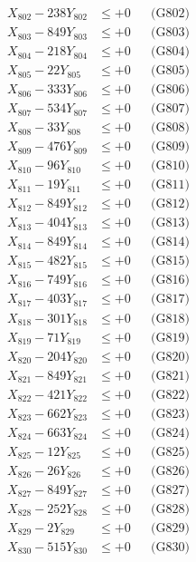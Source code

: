 \documentclass[a4paper,10pt]{article}
\begin{document}
{\begin{align}
X_{802} - 238Y_{802} &\leq +0 && \text{(G802)} \\
X_{803} - 849Y_{803} &\leq +0 && \text{(G803)} \\
X_{804} - 218Y_{804} &\leq +0 && \text{(G804)} \\
X_{805} - 22Y_{805} &\leq +0 && \text{(G805)} \\
X_{806} - 333Y_{806} &\leq +0 && \text{(G806)} \\
X_{807} - 534Y_{807} &\leq +0 && \text{(G807)} \\
X_{808} - 33Y_{808} &\leq +0 && \text{(G808)} \\
X_{809} - 476Y_{809} &\leq +0 && \text{(G809)} \\
X_{810} - 96Y_{810} &\leq +0 && \text{(G810)} \\
\allowbreak
X_{811} - 19Y_{811} &\leq +0 && \text{(G811)} \\
X_{812} - 849Y_{812} &\leq +0 && \text{(G812)} \\
X_{813} - 404Y_{813} &\leq +0 && \text{(G813)} \\
X_{814} - 849Y_{814} &\leq +0 && \text{(G814)} \\
X_{815} - 482Y_{815} &\leq +0 && \text{(G815)} \\
X_{816} - 749Y_{816} &\leq +0 && \text{(G816)} \\
X_{817} - 403Y_{817} &\leq +0 && \text{(G817)} \\
X_{818} - 301Y_{818} &\leq +0 && \text{(G818)} \\
X_{819} - 71Y_{819} &\leq +0 && \text{(G819)} \\
X_{820} - 204Y_{820} &\leq +0 && \text{(G820)} \\
\allowbreak
X_{821} - 849Y_{821} &\leq +0 && \text{(G821)} \\
X_{822} - 421Y_{822} &\leq +0 && \text{(G822)} \\
X_{823} - 662Y_{823} &\leq +0 && \text{(G823)} \\
X_{824} - 663Y_{824} &\leq +0 && \text{(G824)} \\
X_{825} - 12Y_{825} &\leq +0 && \text{(G825)} \\
X_{826} - 26Y_{826} &\leq +0 && \text{(G826)} \\
X_{827} - 849Y_{827} &\leq +0 && \text{(G827)} \\
X_{828} - 252Y_{828} &\leq +0 && \text{(G828)} \\
X_{829} - 2Y_{829} &\leq +0 && \text{(G829)} \\
X_{830} - 515Y_{830} &\leq +0 && \text{(G830)} \\

\end{align}}
\end{document}
